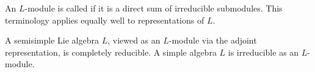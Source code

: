 An $L$-module is called  if it is a direct sum of irreducible submodules. This terminology applies equally well to representations of $L$.

A semisimple Lie algebra $L$, viewed as an $L$-module via the adjoint representation, is completely reducible. A simple algebra $L$ is irreducible as an $L$-module.
